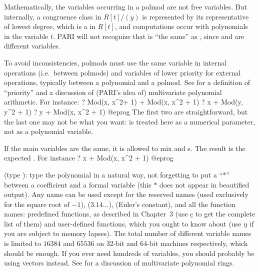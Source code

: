\label{se:rempolmod}
Mathematically, the variables occurring in a polmod are not
free variables. But internally, a congruence class in $R[t]/(y)$ is
represented by its representative  of lowest degree, which is a  in
$R[t]$, and computations occur with polynomials in the variable $t$. PARI
will not recognize that  is ``the same'' as
, since  and  are different variables.

To avoid inconsistencies, polmods must use the same variable in internal
operations (i.e.~between polmods) and variables of lower priority for
external operations, typically between a polynomial and a polmod. See
 for a definition of ``priority'' and a discussion of
(PARI's idea of) multivariate polynomial arithmetic.
For instance:
\bprog
    ? Mod(x, x^2+ 1) + Mod(x, x^2 + 1)
    ? x + Mod(y, y^2 + 1)
    ? y + Mod(x, x^2 + 1)
@eprog\noindent
The first two are straightforward, but the last one may not be what you
want:  is treated here as a numerical parameter, not as a polynomial
variable.

If the main variables are the same, it is allowed to mix  and
s. The result is the expected . For instance
\bprog
    ? x + Mod(x, x^2 + 1)
@eprog

\label{se:pol}
(type ): type the polynomial in a natural way, not
forgetting to put a ``$*$'' between a coefficient and a formal variable
(this $*$ does not appear in beautified output). Any  name
can be used except for the reserved names  (used exclusively for the
square root of $-1$),  ($3.14\dots$),  (Euler's
constant), and all the function names: predefined functions, as described
in Chapter~3 (use \b{c} to get the complete list of them) and user-defined
functions, which you ought to know about (use \b{u} if you are subject to
memory lapses). The total number of different variable names is limited to
$16384$ and $65536$ on 32-bit and 64-bit machines respectively, which
should be enough. If you ever need hundreds of variables, you should
probably be using vectors instead. See  for a discussion
of multivariate polynomial rings.

